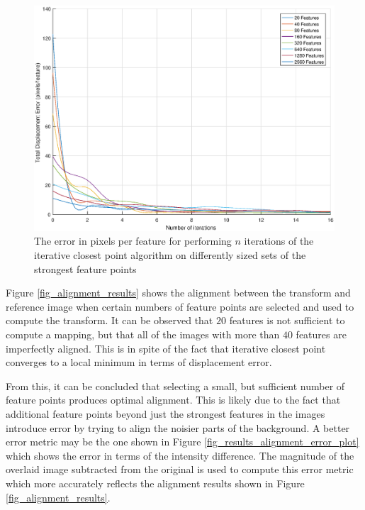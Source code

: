 \documentclass{article}
\begin{document}
\begin{figure}[h]
	\centering
	\includegraphics[width=\textwidth]{figures/alignment/error_for_iterations}
	\caption{The error in pixels per feature for performing $n$ iterations of the iterative closest point algorithm on differently sized sets of the strongest feature points}
	\label{fig_results_error_plot}
\end{figure}

Figure \ref{fig_alignment_results} shows the alignment between the transform and reference image when certain numbers of feature points are selected and used to compute the transform. It can be observed that $20$ features is not sufficient to compute a mapping, but that all of the images with more than $40$ features are imperfectly aligned. This is in spite of the fact that iterative closest point converges to a local minimum in terms of displacement error.

From this, it can be concluded that selecting a small, but sufficient number of feature points produces optimal alignment. This is likely due to the fact that additional feature points beyond just the strongest features in the images introduce error by trying to align the noisier parts of the background. A better error metric may be the one shown in Figure \ref{fig_results_alignment_error_plot} which shows the error in terms of the intensity difference. The magnitude of the overlaid image subtracted from the original is used to compute this error metric which more accurately reflects the alignment results shown in Figure \ref{fig_alignment_results}.
\end{document}

